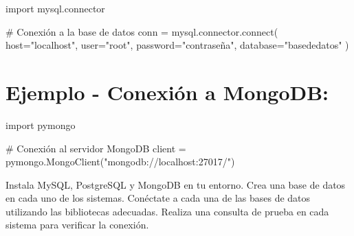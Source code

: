 \documentclass[
  a4paper,
  onepage,
  openany]{scrreprt}
\newenvironment{Shaded}{\begin{snugshade}}{\end{snugshade}}
\newcommand{\CommentTok}[1]{\textcolor[rgb]{0.37,0.37,0.37}{#1}}
\newcommand{\ExtensionTok}[1]{\textcolor[rgb]{0.00,0.23,0.31}{#1}}
\newcommand{\ImportTok}[1]{\textcolor[rgb]{0.00,0.46,0.62}{#1}}
\newcommand{\NormalTok}[1]{\textcolor[rgb]{0.00,0.23,0.31}{#1}}
\newcommand{\OperatorTok}[1]{\textcolor[rgb]{0.37,0.37,0.37}{#1}}
\newcommand{\StringTok}[1]{\textcolor[rgb]{0.13,0.47,0.30}{#1}}
\begin{document}
\begin{Shaded}
\begin{Highlighting}[]
\ImportTok{import}\NormalTok{ mysql.connector}

\CommentTok{\# Conexión a la base de datos}
\NormalTok{conn }\OperatorTok{=}\NormalTok{ mysql.connector.}\ExtensionTok{connect}\NormalTok{(}
\NormalTok{    host}\OperatorTok{=}\StringTok{"localhost"}\NormalTok{,}
\NormalTok{    user}\OperatorTok{=}\StringTok{"root"}\NormalTok{,}
\NormalTok{    password}\OperatorTok{=}\StringTok{"contraseña"}\NormalTok{,}
\NormalTok{    database}\OperatorTok{=}\StringTok{"basededatos"}
\NormalTok{)}
\end{Highlighting}
\end{Shaded}

\hypertarget{ejemplo---conexiuxf3n-a-mongodb}{%
\section{Ejemplo - Conexión a
MongoDB:}\label{ejemplo---conexiuxf3n-a-mongodb}}

\begin{Shaded}
\begin{Highlighting}[]
\ImportTok{import}\NormalTok{ pymongo}

\CommentTok{\# Conexión al servidor MongoDB}
\NormalTok{client }\OperatorTok{=}\NormalTok{ pymongo.MongoClient(}\StringTok{"mongodb://localhost:27017/"}\NormalTok{)}
\end{Highlighting}
\end{Shaded}

\begin{tcolorbox}[enhanced jigsaw, breakable, opacityback=0, toptitle=1mm, coltitle=black, toprule=.15mm, rightrule=.15mm, colframe=quarto-callout-important-color-frame, opacitybacktitle=0.6, arc=.35mm, title=\textcolor{quarto-callout-important-color}{\faExclamation}\hspace{0.5em}{Actividad Práctica:}, titlerule=0mm, colbacktitle=quarto-callout-important-color!10!white, bottomtitle=1mm, bottomrule=.15mm, colback=white, left=2mm, leftrule=.75mm]

Instala MySQL, PostgreSQL y MongoDB en tu entorno. Crea una base de
datos en cada uno de los sistemas. Conéctate a cada una de las bases de
datos utilizando las bibliotecas adecuadas. Realiza una consulta de
prueba en cada sistema para verificar la conexión.

\end{tcolorbox}
\end{document}
